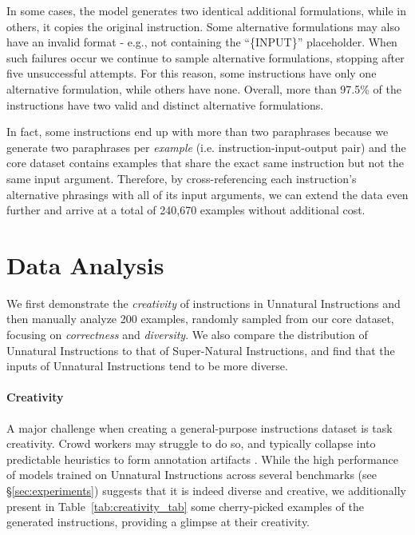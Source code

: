 In some cases, the model generates two identical additional formulations, while in others, it copies the original instruction. Some alternative formulations may also have an invalid format - e.g., not containing the ``\{INPUT\}'' placeholder. When such failures occur we continue to sample alternative formulations, stopping after five unsuccessful attempts. For this reason, some instructions have only one alternative formulation, while others have none. Overall, more than 97.5\% of the instructions have two valid and distinct alternative formulations.

In fact, some instructions end up with more than two paraphrases because we generate two paraphrases per \emph{example} (i.e. instruction-input-output pair) and the core dataset contains examples that share the exact same instruction but not the same input argument. Therefore, by cross-referencing each instruction's alternative phrasings with all of its input arguments, we can extend the data even further and arrive at a total of 240,670 examples without additional cost.



\section{Data Analysis}
\label{sec:analysis}

We first demonstrate the \emph{creativity} of instructions in Unnatural Instructions and then manually analyze 200 examples, randomly sampled from our core dataset, focusing on \textit{correctness} and \textit{diversity}. We also compare the distribution of Unnatural Instructions to that of Super-Natural Instructions, and find that the inputs of Unnatural Instructions tend to be more diverse.

\paragraph{Creativity}
A major challenge when creating a general-purpose instructions dataset is task creativity. Crowd workers may struggle to do so, and typically collapse into predictable heuristics to form annotation artifacts \cite{gururangan-etal-2018-annotation}. While the high performance of models trained on Unnatural Instructions across several benchmarks (see \S\ref{sec:experiments}) suggests that it is indeed diverse and creative, we additionally present in Table~\ref{tab:creativity_tab} some cherry-picked examples of the generated instructions, providing a glimpse at their creativity.


